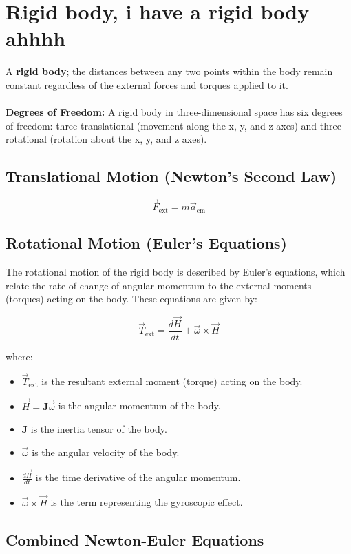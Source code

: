 \section{Rigid body, i have a rigid body ahhhh}
A \textbf{rigid body}; the distances between any two points within the body remain constant regardless of the external forces and torques applied to it.
\\
\\
\textbf{Degrees of Freedom:} A rigid body in three-dimensional space has six degrees of freedom: three translational (movement along the x, y, and z axes) and three rotational (rotation about the x, y, and z axes).

\subsection{Translational Motion (Newton's Second Law)}
\[
\vec{F}_{\text{ext}} = m \vec{a}_{\text{cm}}
\]

\subsection{Rotational Motion (Euler's Equations)}

The rotational motion of the rigid body is described by Euler's equations, which relate the rate of change of angular momentum to the external moments (torques) acting on the body. These equations are given by:

\[
\vec{T}_{\text{ext}} = \frac{d \vec{H}}{dt} + \vec{\omega} \times \vec{H}
\]

where:
\begin{itemize}
    \item \( \vec{T}_{\text{ext}} \) is the resultant external moment (torque) acting on the body.
    \item \( \vec{H} = \mathbf{J} \vec{\omega} \) is the angular momentum of the body.
    \item \( \mathbf{J} \) is the inertia tensor of the body.
    \item \( \vec{\omega} \) is the angular velocity of the body.
    \item \( \frac{d \vec{H}}{dt} \) is the time derivative of the angular momentum.
    \item \( \vec{\omega} \times \vec{H} \) is the term representing the gyroscopic effect.
\end{itemize}

\subsection{Combined Newton-Euler Equations}

